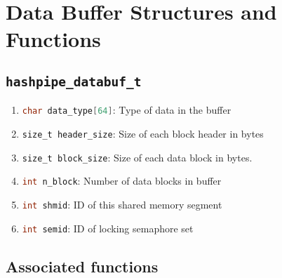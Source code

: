 \documentclass[12pt]{article}
\def\clst{\lstinline[basicstyle=\ttfamily,breaklines=true,language=C]}
\begin{document}
\section{Data Buffer Structures and Functions}

\subsection{\clst{hashpipe_databuf_t}}

\begin{enumerate}
\item \clst{char data_type[64]}: Type of data in the buffer
\item \clst{size_t header_size}: Size of each block header in bytes 
\item \clst{size_t block_size}: Size of each data block in bytes.
\item \clst{int n_block}: Number of data blocks in buffer
\item \clst{int shmid}: ID of this shared memory segment
\item \clst{int semid}: ID of locking semaphore set
\end{enumerate}

\subsection{Associated functions}
\end{document}
